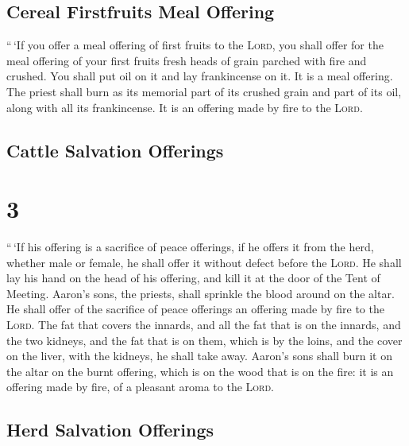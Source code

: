 \hypertarget{cereal-firstfruits-meal-offering}{%
\subsection{Cereal Firstfruits Meal
Offering}\label{cereal-firstfruits-meal-offering}}

 ``\,`If you offer a meal offering of first fruits to the
\textsc{Lord}, you shall offer for the meal offering of your first
fruits fresh heads of grain parched with fire and crushed.
 You shall put oil on it and lay frankincense on it. It
is a meal offering.  The priest shall burn as its
memorial part of its crushed grain and part of its oil, along with all
its frankincense. It is an offering made by fire to the \textsc{Lord}.

\hypertarget{cattle-salvation-offerings}{%
\subsection{Cattle Salvation
Offerings}\label{cattle-salvation-offerings}}

\hypertarget{section-2}{%
\section{3}\label{section-2}}

 ``\,`If his offering is a sacrifice of peace offerings,
if he offers it from the herd, whether male or female, he shall offer it
without defect before the \textsc{Lord}.  He shall lay his
hand on the head of his offering, and kill it at the door of the Tent of
Meeting. Aaron's sons, the priests, shall sprinkle the blood around on
the altar.  He shall offer of the sacrifice of peace
offerings an offering made by fire to the \textsc{Lord}. The fat that
covers the innards, and all the fat that is on the innards,
 and the two kidneys, and the fat that is on them, which
is by the loins, and the cover on the liver, with the kidneys, he shall
take away.  Aaron's sons shall burn it on the altar on the
burnt offering, which is on the wood that is on the fire: it is an
offering made by fire, of a pleasant aroma to the \textsc{Lord}.

\hypertarget{herd-salvation-offerings}{%
\subsection{Herd Salvation Offerings}\label{herd-salvation-offerings}}


